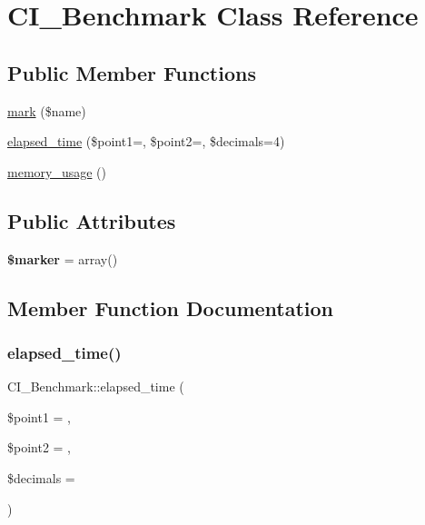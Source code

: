 \hypertarget{class_c_i___benchmark}{}\section{C\+I\+\_\+\+Benchmark Class Reference}
\label{class_c_i___benchmark}
\subsection*{Public Member Functions}
\begin{DoxyCompactItemize}
\item 
\mbox{\hyperlink{class_c_i___benchmark_aee41a4e02b5b4b39eba5cf220103b788}{mark}} (\$name)
\item 
\mbox{\hyperlink{class_c_i___benchmark_a3d290b9dbfddcbc4366513da3ca3b294}{elapsed\+\_\+time}} (\$point1=\textquotesingle{}\textquotesingle{}, \$point2=\textquotesingle{}\textquotesingle{}, \$decimals=4)
\item 
\mbox{\hyperlink{class_c_i___benchmark_a802a75d48eaf912a38cce7628c637bc1}{memory\+\_\+usage}} ()
\end{DoxyCompactItemize}
\subsection*{Public Attributes}
\begin{DoxyCompactItemize}
\item 
\mbox{\label{class_c_i___benchmark_a55403c8096ec5eff235bb9d5f759927e}} 
{\bfseries \$marker} = array()
\end{DoxyCompactItemize}


\subsection{Member Function Documentation}
\mbox{\label{class_c_i___benchmark_a3d290b9dbfddcbc4366513da3ca3b294}} 
\subsubsection{\texorpdfstring{elapsed\+\_\+time()}{elapsed\_time()}}
{\footnotesize\ttfamily C\+I\+\_\+\+Benchmark\+::elapsed\+\_\+time (\begin{DoxyParamCaption}\item[{}]{\$point1 = {\ttfamily \textquotesingle{}\textquotesingle{}},  }\item[{}]{\$point2 = {\ttfamily \textquotesingle{}\textquotesingle{}},  }\item[{}]{\$decimals = {} }\end{DoxyParamCaption})}

